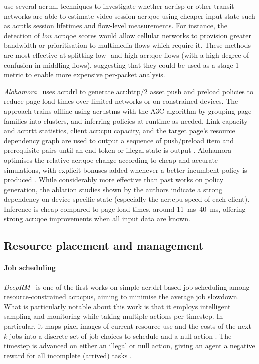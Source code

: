\Textcite{DBLP:conf/conext/ManglaHZA20} use several \gls{acr:ml} techniques to investigate whether \gls{acr:isp} or other transit networks are able to estimate video session \gls{acr:qoe} using cheaper input state such as \gls{acr:tls} session lifetimes and flow-level measurements.
For instance, the detection of \emph{low} \gls{acr:qoe} scores would allow cellular networks to provision greater bandwidth or prioritisation to multimedia flows which require it.
These methods are most effective at splitting low- and high-\gls{acr:qoe} flows (with a high degree of confusion in middling flows), suggesting that they could be used as a stage-1 metric to enable more expensive per-packet analysis.

\emph{Alohamora}~\parencite{DBLP:conf/nsdi/KansalRN21} uses \gls{acr:drl} to generate \gls{acr:http}/2 asset push and preload policies to reduce page load times over limited networks or on constrained devices.
The approach trains offline using \glspl{acr:lstm} with the A3C algorithm by grouping page families into clusters, and inferring policies at runtime as needed.
Link capacity and \gls{acr:rtt} statistics, client \gls{acr:cpu} capacity, and the target page's resource dependency graph \prllitstate{} are used to output a sequence of push/preload item and prerequisite pairs until an end-token or illegal state is output \prllitact{}.
Alohamora optimises the relative \gls{acr:qoe} change according to cheap and accurate simulations, with explicit bonuses added whenever a better incumbent policy is produced \prllitreward{}.
While considerably more effective than past works on policy generation, the ablation studies shown by the authors indicate a strong dependency on device-specific state (especially the \gls{acr:cpu} speed of each client).
Inference is cheap compared to page load times, around \qtyrange{11}{40}{\milli\second}, offering strong \gls{acr:qoe} improvements when all input data are known.

\subsection{Resource placement and management}

\paragraph{Job scheduling}
\emph{DeepRM}~\parencite{DBLP:conf/hotnets/MaoAMK16} is one of the first works on simple \gls{acr:drl}-based job scheduling among resource-constrained \glspl{acr:cpu}, aiming to minimise the average job slowdown.
What is particularly notable about this work is that it employs intelligent sampling and monitoring while taking multiple actions per timestep.
In particular, it maps pixel images of current resource use and the costs of the next $k$ jobs \prllitstate{} into a discrete set of job choices to schedule and a null action \prllitact.
The timestep is advanced on either an illegal or null action, giving an agent a negative reward for all incomplete (arrived) tasks \prllitreward.

